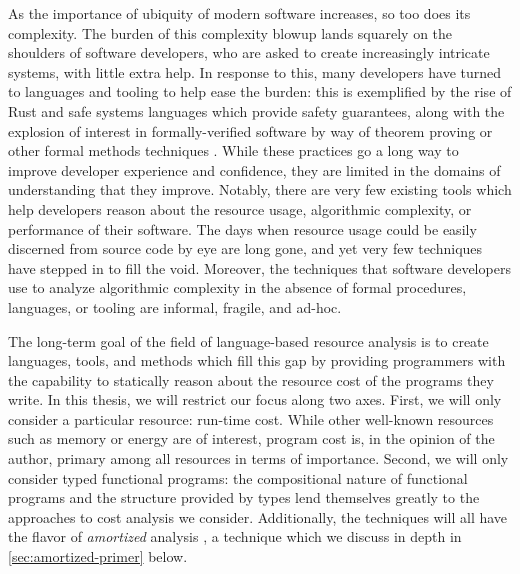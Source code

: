 

As the importance of ubiquity of modern software increases, so too does its complexity. The burden of this complexity blowup lands squarely on the shoulders of software developers, who are asked to create increasingly intricate systems, with little extra help. In response to this, many developers have turned to languages and tooling to help ease the burden: this is exemplified by the rise of Rust and safe systems languages \citehere which provide safety guarantees, along with the explosion of interest in formally-verified software by way of theorem proving or other formal methods techniques \cite{ringer-et-al:qed}. While these practices go a long way to improve developer experience and confidence, they are limited in the domains of understanding that they improve. Notably, there are very few existing tools which help developers reason about the resource usage, algorithmic complexity, or performance of their software. The days when resource usage could be easily discerned from source code by eye are long gone, and yet very few techniques have stepped in to fill the void. Moreover, the techniques that software developers use to analyze algorithmic complexity in the absence of formal procedures, languages, or tooling are informal, fragile, and ad-hoc.

The long-term goal of the field of language-based resource analysis is to create languages, tools, and methods which fill this gap by providing programmers with the capability to statically reason about the resource cost of the programs they write. In this thesis, we will restrict our focus along two axes. First, we will only consider a particular resource: run-time cost. While other well-known resources such as memory or energy are of interest, program cost is, in the opinion of the author, primary among all resources in terms of importance. Second, we will only consider typed functional programs: the compositional nature of functional programs and the structure provided by types lend themselves greatly to the approaches to cost analysis we consider. Additionally, the techniques will all have the flavor of \textit{amortized} analysis \cite{tarjan:amortized-complexity}, a technique which we discuss in depth in \autoref{sec:amortized-primer} below.


